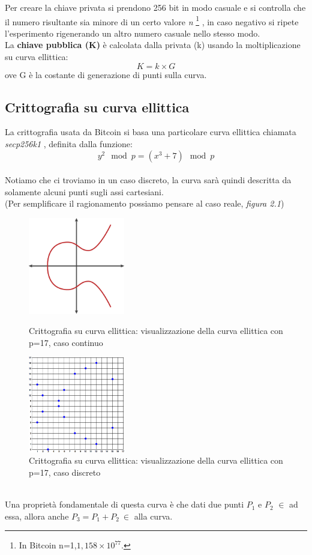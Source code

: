 Per creare la chiave privata si prendono 256 bit in modo casuale e si controlla che il numero risultante sia minore di un certo valore \textit{n} \footnote{In Bitcoin n=1,${1,158\times 10}^{77}$.} , in caso negativo si ripete l'esperimento rigenerando un altro numero casuale nello stesso modo.\\
La \textbf{chiave pubblica (K)} \`e calcolata dalla privata (k) usando la moltiplicazione su curva ellittica:
\begin{equation}
K=k\times G
\end{equation}
ove G \`e la costante di generazione di punti sulla curva. 

 
\subsection{Crittografia su curva ellittica}
\label{sec:sezioni}
La crittografia usata da Bitcoin si basa una particolare curva ellittica chiamata \textit{secp256k1} , definita dalla funzione:
\begin{equation}
{y}^{2} \mod p= ({x}^{3} +7) \mod p
\end{equation}\\
Notiamo che ci troviamo in un caso discreto, la curva sar\`a quindi descritta da solamente alcuni punti sugli assi cartesiani.\\
(Per semplificare il ragionamento possiamo pensare al caso reale, \textit{figura 2.1})
\begin{figure}[!hb]
   \includegraphics[width=0.375\textwidth]{imgs/mbc2_0402.png}
   \hfill
   \caption{Crittografia su curva ellittica: visualizzazione della curva ellittica con p=17, caso continuo}
   \includegraphics[width=0.375\textwidth]{imgs/mbc2_0403.png}
   \caption{Crittografia su curva ellittica: visualizzazione della curva ellittica con p=17, caso discreto}
\end{figure}\\Una propriet\`a fondamentale di questa curva \`e che dati due punti $P_1$ e $P_2$ $\in $ ad essa, allora anche $P_3=P_1+P_2 \ \in $ alla curva. 
